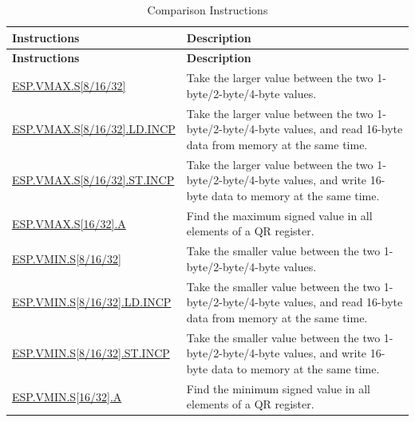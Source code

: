 \begin{longtable}[c]{|l|m{11cm}|}
    \caption{Comparison Instructions}
    \label{tab:pie-comparison-instructions}\\
    \hline
    \rowcolor{lightgray}
    \textbf{Instructions} & \textbf{Description} \\\hline
    \endfirsthead
    \rowcolor{lightgray}
    \textbf{Instructions} & \textbf{Description} \\\hline
    \endhead
    \endfoot

    \hyperref[instruction:ESPVMAXS8]{ESP.VMAX.S[8/16/32]} & Take the larger value between the two 1-byte/2-byte/4-byte values.
    \\\hline
    \hyperref[instruction:ESPVMAXS8LDINCP]{ESP.VMAX.S[8/16/32].LD.INCP} & Take the larger value between the two 1-byte/2-byte/4-byte values, and read 16-byte data from memory at the same time.
    \\\hline
    \hyperref[instruction:ESPVMAXS8STINCP]{ESP.VMAX.S[8/16/32].ST.INCP} & Take the larger value between the two 1-byte/2-byte/4-byte values, and write 16-byte data to memory at the same time.
    \\\hline
        \hyperref[instruction:ESPMAXS16A]{ESP.VMAX.S[16/32].A} & Find the maximum signed value in all elements of a QR register.
    \\\hline
    \hyperref[instruction:ESPVMINS8]{ESP.VMIN.S[8/16/32]} & Take the smaller value between the two 1-byte/2-byte/4-byte values.
    \\\hline
    \hyperref[instruction:ESPVMINS8LDINCP]{ESP.VMIN.S[8/16/32].LD.INCP} & Take the smaller value between the two 1-byte/2-byte/4-byte values, and read 16-byte data from memory at the same time.
    \\\hline
    \hyperref[instruction:ESPVMINS8STINCP]{ESP.VMIN.S[8/16/32].ST.INCP} & Take the smaller value between the two 1-byte/2-byte/4-byte values, and write 16-byte data to memory at the same time.
    \\\hline
    \hyperref[instruction:ESPMINS16A]{ESP.VMIN.S[16/32].A} & Find the minimum signed value in all elements of a QR register.
    \\\hline


\end{longtable}
